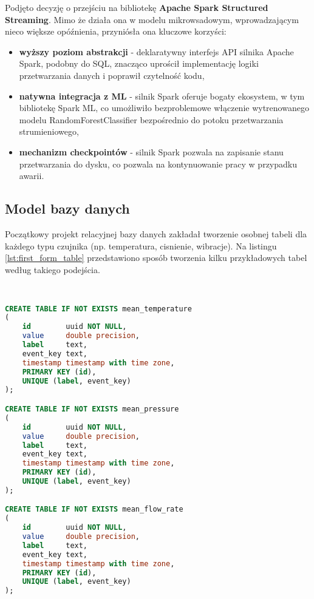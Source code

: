 Podjęto decyzję o przejściu na bibliotekę \textbf{Apache Spark Structured Streaming}. Mimo że działa ona w modelu mikrowsadowym, wprowadzającym nieco większe opóźnienia, przyniósła ona kluczowe korzyści:
\begin{itemize}
    \item \textbf{wyższy poziom abstrakcji} - deklaratywny interfejs API silnika Apache Spark, podobny do SQL, znacząco uprościł implementację logiki przetwarzania danych i poprawił czytelność kodu,
    \item \textbf{natywna integracja z ML} - silnik Spark oferuje bogaty ekosystem, w tym bibliotekę Spark ML, co umożliwiło bezproblemowe włączenie wytrenowanego modelu RandomForestClassifier bezpośrednio do potoku przetwarzania strumieniowego,
    \item \textbf{mechanizm checkpointów} - silnik Spark pozwala na zapisanie stanu przetwarzania do dysku, co pozwala na kontynuowanie pracy w przypadku awarii.
\end{itemize}

\newpage

\subsection{Model bazy danych}

Początkowy projekt relacyjnej bazy danych zakładał tworzenie osobnej tabeli dla każdego typu czujnika (np. temperatura, cisnienie, wibracje). Na listingu \ref{lst:first_form_table} przedstawiono sposób tworzenia kilku przykładowych tabel według takiego podejścia.

\begin{lstlisting}[caption={Pierwsza forma tabeli w relacyjnej bazie danych}, label={lst:first_form_table},language=SQL]


CREATE TABLE IF NOT EXISTS mean_temperature
(
    id        uuid NOT NULL,
    value     double precision,
    label     text,
    event_key text,
    timestamp timestamp with time zone,
    PRIMARY KEY (id),
    UNIQUE (label, event_key)
);

CREATE TABLE IF NOT EXISTS mean_pressure
(
    id        uuid NOT NULL,
    value     double precision,
    label     text,
    event_key text,
    timestamp timestamp with time zone,
    PRIMARY KEY (id),
    UNIQUE (label, event_key)
);

CREATE TABLE IF NOT EXISTS mean_flow_rate
(
    id        uuid NOT NULL,
    value     double precision,
    label     text,
    event_key text,
    timestamp timestamp with time zone,
    PRIMARY KEY (id),
    UNIQUE (label, event_key)
);

\end{lstlisting}


